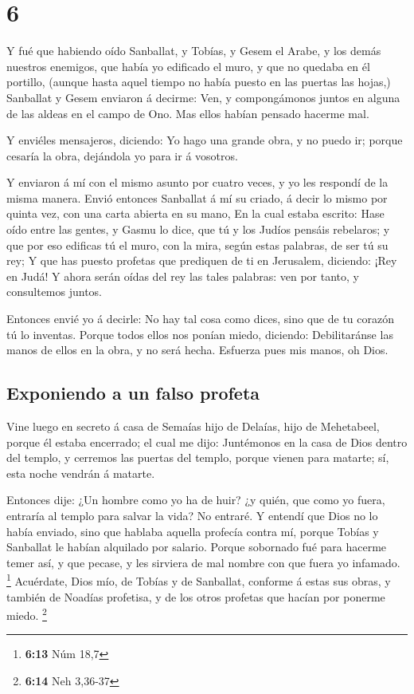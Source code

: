 \hypertarget{section-5}{%
\section{6}\label{section-5}}

 Y fué que habiendo oído Sanballat, y Tobías, y Gesem el
Arabe, y los demás nuestros enemigos, que había yo edificado el muro, y
que no quedaba en él portillo, (aunque hasta aquel tiempo no había
puesto en las puertas las hojas,)  Sanballat y Gesem
enviaron á decirme: Ven, y compongámonos juntos en alguna de las aldeas
en el campo de Ono. Mas ellos habían pensado hacerme mal.

 Y enviéles mensajeros, diciendo: Yo hago una grande obra,
y no puedo ir; porque cesaría la obra, dejándola yo para ir á vosotros.

 Y enviaron á mí con el mismo asunto por cuatro veces, y
yo les respondí de la misma manera.  Envió entonces
Sanballat á mí su criado, á decir lo mismo por quinta vez, con una carta
abierta en su mano,  En la cual estaba escrito: Hase oído
entre las gentes, y Gasmu lo dice, que tú y los Judíos pensáis
rebelaros; y que por eso edificas tú el muro, con la mira, según estas
palabras, de ser tú su rey;  Y que has puesto profetas que
prediquen de ti en Jerusalem, diciendo: ¡Rey en Judá! Y ahora serán
oídas del rey las tales palabras: ven por tanto, y consultemos juntos.

 Entonces envié yo á decirle: No hay tal cosa como dices,
sino que de tu corazón tú lo inventas.  Porque todos ellos
nos ponían miedo, diciendo: Debilitaránse las manos de ellos en la obra,
y no será hecha. Esfuerza pues mis manos, oh Dios.

\hypertarget{exponiendo-a-un-falso-profeta}{%
\subsection{Exponiendo a un falso
profeta}\label{exponiendo-a-un-falso-profeta}}

 Vine luego en secreto á casa de Semaías hijo de Delaías,
hijo de Mehetabeel, porque él estaba encerrado; el cual me dijo:
Juntémonos en la casa de Dios dentro del templo, y cerremos las puertas
del templo, porque vienen para matarte; sí, esta noche vendrán á
matarte.

 Entonces dije: ¿Un hombre como yo ha de huir? ¿y quién,
que como yo fuera, entraría al templo para salvar la vida? No entraré.
 Y entendí que Dios no lo había enviado, sino que hablaba
aquella profecía contra mí, porque Tobías y Sanballat le habían
alquilado por salario.  Porque sobornado fué para hacerme
temer así, y que pecase, y les sirviera de mal nombre con que fuera yo
infamado. \footnote{\textbf{6:13} Núm 18,7}  Acuérdate,
Dios mío, de Tobías y de Sanballat, conforme á estas sus obras, y
también de Noadías profetisa, y de los otros profetas que hacían por
ponerme miedo. \footnote{\textbf{6:14} Neh 3,36-37}

